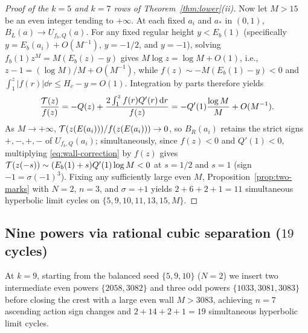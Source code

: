 \begin{proof}[Proof of the $k=5$ and $k=7$ rows of Theorem~\ref{thm:lower}\textup{(ii)}]
Now let $M>15$ be an even integer tending to $+\infty$. At each fixed $a_i$ and $a_*$ in $(0,1)$,
$B_L(a)\to U_{f_b,Q}(a)$. For any fixed regular height $y<E_b(1)$ (specifically
$y=E_b(a_i)+O(M^{-1})$, $y=-1/2$, and $y=-1$), solving $f_b(1)z^M=M(E_b(z)-y)$ gives $M\log z=\log
M+O(1)$, i.e., $z-1=(\log M)/M+O(M^{-1})$, while $f(z)\sim -M(E_b(1)-y)<0$ and $\int_1^z|f(r)|\dd r\le
H_c-y=O(1)$. Integration by parts therefore yields
\begin{equation}\label{eq:wall-correction}
  \frac{\mathcal{T}(z)}{f(z)} = -Q(z) + \frac{2\int_1^z f(r)Q'(r)\,\mathrm{d} r}{f(z)} = -Q'(1)\frac{\log M}{M} + O(M^{-1}).
\end{equation}
As $M\to+\infty$, $\mathcal{T}(z(E(a_i)))/f(z(E(a_i)))\to 0$, so $B_R(a_i)$ retains the strict signs $+,-,+,-$
of $U_{f_b,Q}(a_i)$; simultaneously, since $f(z)<0$ and $Q'(1)<0$, multiplying
\eqref{eq:wall-correction} by $f(z)$ gives $\mathcal{T}(z(-s))\sim (E_b(1)+s)Q'(1)\log M<0$ at $s=1/2$ and
$s=1$ (sign $-1=\sigma(-1)^3$). Fixing any sufficiently large even $M$,
Proposition~\ref{prop:two-marks} with $N=2$, $n=3$, and $\sigma=+1$ yields $2+6+2+1=11$ simultaneous
hyperbolic limit cycles on $\{5,9,10,11,13,15,M\}$.
\end{proof}



\subsection{Nine powers via rational cubic separation ($19$ cycles)}\label{subsec:nine-powers}
At $k=9$, starting from the balanced seed $\{5,9,10\}$ ($N=2$) we insert two intermediate even powers
$\{2058,3082\}$ and three odd powers $\{1033,3081,3083\}$ before closing the crest with a large even
wall $M>3083$, achieving $n=7$ ascending action sign changes and $2+14+2+1=19$ simultaneous hyperbolic
limit cycles.


